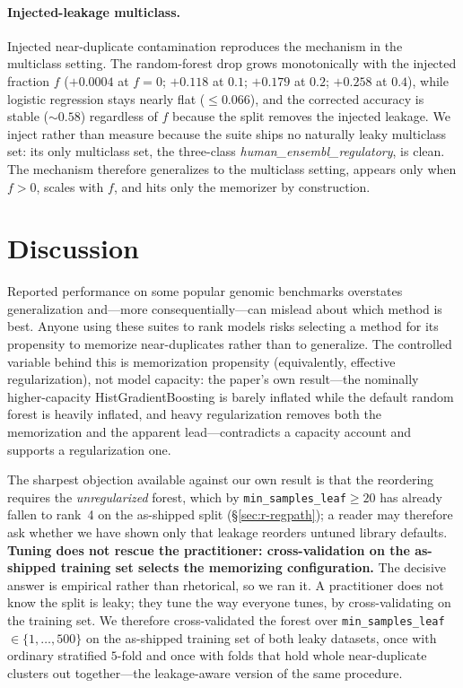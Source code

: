 \documentclass[webpdf,modern,large,namedate]{oup-authoring-template}%
\begin{document}
\paragraph{Injected-leakage multiclass.}
Injected near-duplicate contamination reproduces the mechanism in the multiclass setting. The random-forest drop grows monotonically with the injected fraction $f$ ($+0.0004$ at $f{=}0$; $+0.118$ at $0.1$; $+0.179$ at $0.2$; $+0.258$ at $0.4$), while logistic regression stays nearly flat ($\le0.066$), and the corrected accuracy is stable ($\sim0.58$) regardless of $f$ because the split removes the injected leakage. We inject rather than measure because the suite ships no naturally leaky multiclass set: its only multiclass set, the three-class \textit{human\_ensembl\_regulatory}, is clean. The mechanism therefore generalizes to the multiclass setting, appears only when $f>0$, scales with $f$, and hits only the memorizer by construction.

\section{Discussion}\label{sec:discussion}

Reported performance on some popular genomic benchmarks overstates generalization and---more consequentially---can mislead about which method is best. Anyone using these suites to rank models risks selecting a method for its propensity to memorize near-duplicates rather than to generalize. The controlled variable behind this is memorization propensity (equivalently, effective regularization), not model capacity: the paper's own result---the nominally higher-capacity HistGradientBoosting is barely inflated while the default random forest is heavily inflated, and heavy regularization removes both the memorization and the apparent lead---contradicts a capacity account and supports a regularization one.

The sharpest objection available against our own result is that the reordering requires the \emph{unregularized} forest, which by \texttt{min\_samples\_leaf}$\ge20$ has already fallen to rank~4 on the as-shipped split (\S\ref{sec:r-regpath}); a reader may therefore ask whether we have shown only that leakage reorders untuned library defaults. \textbf{Tuning does not rescue the practitioner: cross-validation on the as-shipped training set selects the memorizing configuration.} The decisive answer is empirical rather than rhetorical, so we ran it. A practitioner does not know the split is leaky; they tune the way everyone tunes, by cross-validating on the training set. We therefore cross-validated the forest over \texttt{min\_samples\_leaf}$\in\{1,\dots,500\}$ on the as-shipped training set of both leaky datasets, once with ordinary stratified $5$-fold and once with folds that hold whole near-duplicate clusters out together---the leakage-aware version of the same procedure.
\end{document}
